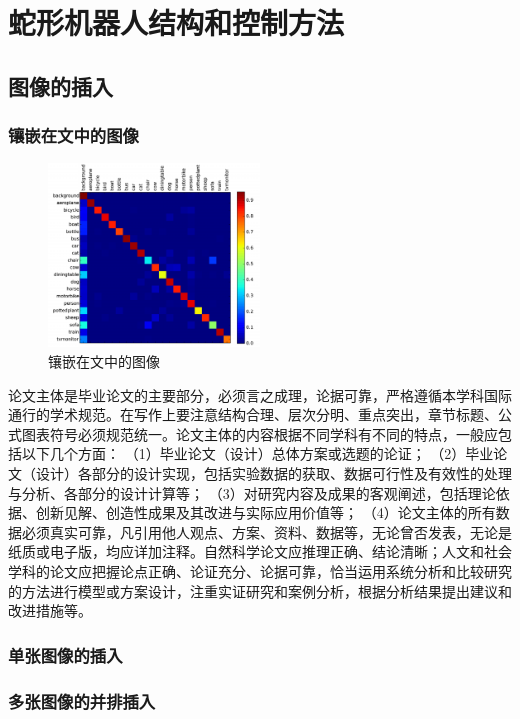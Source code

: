 \chapter{蛇形机器人结构和控制方法}
\label{cha:example}
\section{图像的插入}
\subsection{镶嵌在文中的图像}
\label{sec:Images}
\begin{figure}
	\centering
	\includegraphics[width=0.5\textwidth]{image/result/confusion.pdf}
	\caption{镶嵌在文中的图像}
	\label{fig:confusion}
\end{figure}
论文主体是毕业论文的主要部分，必须言之成理，论据可靠，严格遵循本学科国际通行的学术规范。在写作上要注意结构合理、层次分明、重点突出，章节标题、公式图表符号必须规范统一。论文主体的内容根据不同学科有不同的特点，一般应包括以下几个方面： （1）毕业论文（设计）总体方案或选题的论证； （2）毕业论文（设计）各部分的设计实现，包括实验数据的获取、数据可行性及有效性的处理与分析、各部分的设计计算等； （3）对研究内容及成果的客观阐述，包括理论依据、创新见解、创造性成果及其改进与实际应用价值等； （4）论文主体的所有数据必须真实可靠，凡引用他人观点、方案、资料、数据等，无论曾否发表，无论是纸质或电子版，均应详加注释。自然科学论文应推理正确、结论清晰；人文和社会学科的论文应把握论点正确、论证充分、论据可靠，恰当运用系统分析和比较研究的方法进行模型或方案设计，注重实证研究和案例分析，根据分析结果提出建议和改进措施等。
\subsection{单张图像的插入}


\subsection{多张图像的并排插入}
\label{sub:多张图像的并排插入}



